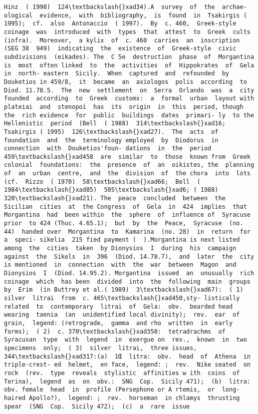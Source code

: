 \documentclass[11pt]{article}
\begin{document}
\begin{Verbatim}[commandchars=\\\{\}]
Hinz  ( 1998)  124\textbackslash{}xad34).A  survey  of  the  archae- ological  evidence,  with  bibliography,  is  found  in  Tsakirgis ( 1995);  cf.  also  Antonaccio  ( 1997).  By  c. 460,  Greek-style coinage  was  introduced  with  types  that  attest  to  Greek  cults (infra).  Moreover,  a kylix  of  c. 460  carries  an  inscription (SEG 38  949)  indicating  the  existence  of  Greek-style  civic subdivisions  (eikades). The  C 5e  destruction  phase  of  Morgantina  is  most  often linked  to  the  activities  of  Hippokrates  of  Gela  in  north- eastern  Sicily.  When  captured  and  refounded  by  Douketios in 459/8,  it  became  an  axiologos  polis  according  to Diod. 11.78.5.  The  new  settlement  on  Serra  Orlando  was  a  city founded  according  to  Greek  customs:  a  formal  urban  layout with  plateiai  and  stenopoi  has  its  origin  in  this  period, though  the  rich evidence  for  public  buildings  dates  primari- ly  to the  Hellenistic  period  (Bell  ( 1988)  314\textbackslash{}xad16;  Tsakirgis ( 1995)  126\textbackslash{}xad27).  The  acts  of  foundation  and  the  terminology employed  by  Diodorus  in  connection  with  Douketios'foun- dations  in  the  period  459\textbackslash{}xad458  are  similar  to  those  known from  Greek  colonial  foundations:  the  presence  of  an  oikistes, the  planning  of  an  urban  centre,  and  the  division  of  the chora  into  lots  (cf.  Rizzo  ( 1970)  58\textbackslash{}xad66;  Bell  ( 1984\textbackslash{}xad85)  505\textbackslash{}xad6; ( 1988)  320\textbackslash{}xad21). The  peace  concluded  between  the  Sicilian  cities  at  the Congress  of  Gela  in  424  implies  that  Morgantina  had  been within  the  sphere  of  influence of  Syracuse  prior  to 424 (Thuc. 4.65.1);  but  by  the  Peace,  Syracuse  (no. 44)  handed over  Morgantina  to  Kamarina  (no. 28)  in  return  for  a  speci- sikelia  215 fied payment (  ).Morgantina is next listed among  the  cities  taken  by Dionysios  I  during  his  campaign against  the  Sikels  in  396  (Diod. 14.78.7),  and  later  the  city  is mentioned  in  connection  with  the  war  between  Magon  and Dionysios  I  (Diod. 14.95.2). Morgantina  issued  an  unusually  rich  coinage  which  has been  divided  into  the  following  main  groups  by  Erim  (in Buttrey et al.( 1989)  3\textbackslash{}xad67):  ( 1)  silver  litrai  from  c. 465\textbackslash{}xad450,sty- listically  related  to  contemporary  litrai  of  Gela:  obv.  bearded head  wearing  taenia  (an  unidentified local divinity);  rev.  ear  of grain,  legend: (retrograde,  gamma  and rho  written  in  early  forms);  ( 2)  c. 370\textbackslash{}xad350:  tetradrachms  of Syracusan  type  with  legend  in  exergue on  rev.,  known  in  two  specimens  only;  ( 3)  silver  litrai,  three issues, 344\textbackslash{}xad317:(a)  1Œ  litra:  obv.  head  of  Athena  in  triple-crest- ed  helmet,  en face,  legend: ;  rev.  Nike seated  on  rock  (rev.  type  reveals  stylistic  affinities w ith  coins  of Terina),  legend  as  on  obv.:  SNG  Cop.  Sicily 471);  (b)  litra:  obv. female  head  in  profile (Persephone or A rtemis,  or  long-haired Apollo?),  legend: ;  rev.  horseman  in chlamys  thrusting  spear  (SNG  Cop.  Sicily 472);  (c)  a  rare  issue 
\end{Verbatim}
\end{document}
